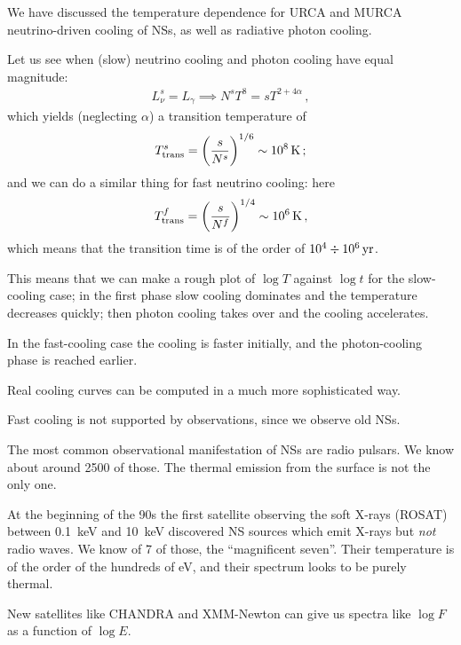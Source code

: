 \documentclass[main.tex]{subfiles}
\begin{document}

We have discussed the temperature dependence for URCA and MURCA neutrino-driven cooling of NSs, as well as radiative photon cooling.

Let us see when (slow) neutrino cooling and photon cooling have equal magnitude: 
%
\begin{align}
L_\nu^{s} = L_\gamma  \implies N^{s} T^{8} = s T^{2 + 4 \alpha }
\,,
\end{align}
%
which yields (neglecting \(\alpha \)) a transition temperature of 
%
\begin{align}
T_{\text{trans}}^{s} = \qty(\frac{s}{N^{s}})^{1/6} \sim \SI{e8}{K}
\,;
\end{align}
%
and we can do a similar thing for fast neutrino cooling: here 
%
\begin{align}
T _{\text{trans}}^{f} = \qty(\frac{s}{N^{f}})^{1/4} \sim \SI{e6}{K}
\,,
\end{align}
%
which means that the transition time is of the order of \(\num{e4} \divisionsymbol \SI{e6}{yr}\). 

This means that we can make a rough plot of \(\log T\) against \(\log t\) for the slow-cooling case; in the first phase slow cooling dominates and the temperature decreases quickly; then photon cooling takes over and the cooling accelerates. 

In the fast-cooling case the cooling is faster initially, and the photon-cooling phase is reached earlier. 

Real cooling curves can be computed in a much more sophisticated way.

Fast cooling is not supported by observations, since we observe old NSs. 

The most common observational manifestation of NSs are radio pulsars. 
We know about around 2500 of those. 
The thermal emission from the surface is not the only one. 

At the beginning of the 90s the first satellite observing the soft X-rays (ROSAT) between \SI{.1}{keV} and \SI{10}{keV} discovered NS sources which emit X-rays but \emph{not} radio waves. 
We know of 7 of those, the ``magnificent seven''. 
Their temperature is of the order of the hundreds of eV, and their spectrum looks to be purely thermal. 

New satellites like CHANDRA and XMM-Newton can give us spectra like \(\log F\) as a function of \(\log E\).
\end{document}
